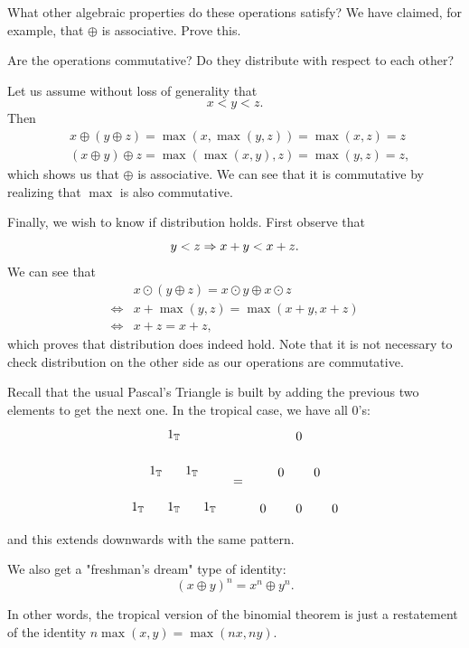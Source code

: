 \documentclass[12pt]{memoir}
\theoremstyle{definition}
\begin{document}
\begin{Ej}
What other algebraic properties do these operations satisfy? We have claimed, for example, that $\oplus$ is associative. Prove this.\par 
Are the operations commutative? Do they distribute with respect to each other?
\end{Ej}

\begin{ptcb}
Let us assume without loss of generality that 
$$x<y<z.$$
Then 
\begin{align*}
    &x\oplus (y\oplus z)=\max(x,\max(y,z))=\max(x,z)=z\\
    &(x\oplus y)\oplus z=\max(\max(x,y),z)=\max(y,z)=z,
\end{align*}
which shows us that $\oplus$ is associative. We can see that it is commutative by realizing that $\max$ is also commutative.\par 
Finally, we wish to know if distribution holds. First observe that 
$$y<z\Rightarrow x+y<x+z.$$
We can see that 
\begin{align*}
&x\odot(y\oplus z)=x\odot y\oplus x\odot z\\
\iff &x+\max(y,z)=\max(x+y,x+z)\\
\iff &x+z=x+z,
\end{align*}
which proves that distribution does indeed hold. Note that it is not necessary to check distribution on the other side as our operations are commutative.
\end{ptcb}

\begin{Prop}
Recall that the usual Pascal's Triangle is built by adding the previous two elements to get the next one. In the tropical case, we have all 0's:
$$
\begin{tikzpicture}
    \foreach \n in {0,...,2} {
      \foreach \k in {0,...,\n} {
        \node at (\k-\n/2,-\n) {$1_\bT$};
      }
    }
    \end{tikzpicture}
    \word{\raisebox{2.5em}{=}}%
    \begin{tikzpicture}
        \foreach \n in {0,...,2} {
          \foreach \k in {0,...,\n} {
            \node at (\k-\n/2,-\n) {$0$};
          }
        }
        \end{tikzpicture}
    $$
    and this extends downwards with the same pattern.\par 
    We also get  a "freshman's dream" type of identity:
    $$(x\oplus y)^n=x^n\oplus y^n.$$

In other words, the tropical version of the binomial theorem is just a restatement of the identity $n\max(x,y)=\max(nx,ny)$.
\end{Prop}
\end{document}
